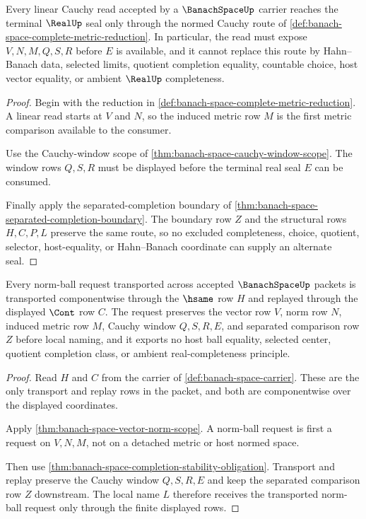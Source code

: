 \begin{theorem}
\label{thm:banach-space-linear-cauchy-seal}
Every linear Cauchy read accepted by a $\BanachSpaceUp$ carrier reaches the terminal $\RealUp$ seal only through the normed Cauchy route of \autoref{def:banach-space-complete-metric-reduction}. In particular, the read must expose $V,N,M,Q,S,R$ before $E$ is available, and it cannot replace this route by Hahn--Banach data, selected limits, quotient completion equality, countable choice, host vector equality, or ambient $\RealUp$ completeness.
\end{theorem}
\begin{proof}
Begin with the reduction in \autoref{def:banach-space-complete-metric-reduction}. A linear read starts at $V$ and $N$, so the induced metric row $M$ is the first metric comparison available to the consumer.

Use the Cauchy-window scope of \autoref{thm:banach-space-cauchy-window-scope}. The window rows $Q,S,R$ must be displayed before the terminal real seal $E$ can be consumed.

Finally apply the separated-completion boundary of \autoref{thm:banach-space-separated-completion-boundary}. The boundary row $Z$ and the structural rows $H,C,P,L$ preserve the same route, so no excluded completeness, choice, quotient, selector, host-equality, or Hahn--Banach coordinate can supply an alternate seal.
\end{proof}

\begin{theorem}
\label{thm:banach-space-norm-ball-transport}
Every norm-ball request transported across accepted $\BanachSpaceUp$ packets is transported componentwise through the $\hsame$ row $H$ and replayed through the displayed $\Cont$ row $C$. The request preserves the vector row $V$, norm row $N$, induced metric row $M$, Cauchy window $Q,S,R,E$, and separated comparison row $Z$ before local naming, and it exports no host ball equality, selected center, quotient completion class, or ambient real-completeness principle.
\end{theorem}
\begin{proof}
Read $H$ and $C$ from the carrier of \autoref{def:banach-space-carrier}. These are the only transport and replay rows in the packet, and both are componentwise over the displayed coordinates.

Apply \autoref{thm:banach-space-vector-norm-scope}. A norm-ball request is first a request on $V,N,M$, not on a detached metric or host normed space.

Then use \autoref{thm:banach-space-completion-stability-obligation}. Transport and replay preserve the Cauchy window $Q,S,R,E$ and keep the separated comparison row $Z$ downstream. The local name $L$ therefore receives the transported norm-ball request only through the finite displayed rows.
\end{proof}

